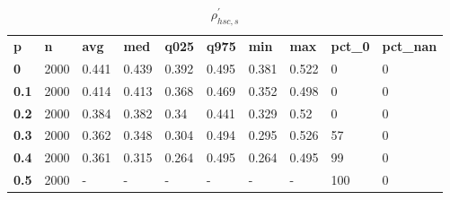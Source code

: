 \begin{table}[h]
 \centering 
\footnotesize
\caption{$\rho_{hsc,s}^\prime $}
\label{tab:alphahscs}
\begin{tabular}[h]{| l l l l l l l l l l|
    } \hline
\textbf{ p} & \textbf{ n} & \textbf{ avg} & \textbf{ med} & \textbf{ q025} & \textbf{ q975} & \textbf{ min} & \textbf{ max} & \textbf{ pct\_0} & \textbf{ pct\_nan}
           \\
  \textbf{  0} & 2000 & 0.441 & 0.439 & 0.392 & 0.495 & 0.381 & 0.522 &   0 & 0
           \\
  \textbf{0.1} & 2000 & 0.414 & 0.413 & 0.368 & 0.469 & 0.352 & 0.498 &   0 & 0
           \\
  \textbf{0.2} & 2000 & 0.384 & 0.382 &  0.34 & 0.441 & 0.329 &  0.52 &   0 & 0
           \\
  \textbf{0.3} & 2000 & 0.362 & 0.348 & 0.304 & 0.494 & 0.295 & 0.526 &  57 & 0
           \\
  \textbf{0.4} & 2000 & 0.361 & 0.315 & 0.264 & 0.495 & 0.264 & 0.495 &  99 & 0
           \\
  \textbf{0.5} & 2000 & - & - & - & - & - & - & 100 & 0
           \\
 \hline \end{tabular}
 \end{table}
